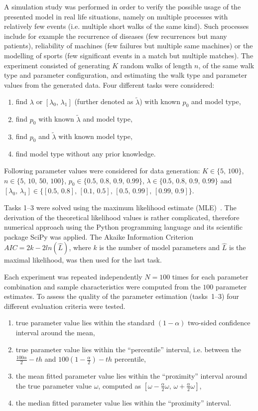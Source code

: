 \documentclass{amsart}
\theoremstyle{definition}
\theoremstyle{plain}
\theoremstyle{plain}
\theoremstyle{plain}
\numberwithin{equation}{section}
\begin{document}
    A simulation study was performed in order to verify the possible usage of the presented model in real life situations, namely on multiple processes with relatively few events (i.e. multiple short walks of the same kind).
    Such processes include for example the recurrence of diseases (few recurrences but many patients), reliability of machines (few failures but multiple same machines) or the modelling of sports (few significant events in a match but multiple matches).
    The experiment consisted of generating $K$ random walks of length $n$, of the same walk type and parameter configuration, and estimating the walk type and parameter values from the generated data.
    Four different tasks were considered:
    \begin{enumerate}
        \item find $\lambda$ or $[\lambda_{0},\,\lambda_{1}]$ (further denoted as $\tilde{\lambda}$) with known $p_{0}$ and model type,
        \item find $p_{0}$ with known $\tilde{\lambda}$ and model type,
        \item find $p_{0}$ and $\tilde{\lambda}$ with known model type,
        \item find model type without any prior knowledge.
    \end{enumerate}
    Following parameter values were considered for data generation: $K\in\{5,\,100\}$, $n\in\{5,\,10,\,50,\,100\}$, $p_{0}\in\{0.5,\,0.8,\,0.9,\,0.99\}$, $\lambda\in\{0.5,\,0.8,\,0.9,\,0.99\}$ and $[\lambda_{0},\,\lambda_{1}]\in\{[0.5,\,0.8],\,[0.1,\,0.5],\,[0.5,\,0.99],\,[0.99,\,0.9]\}$.


    Tasks 1--3 were solved using the maximum likelihood estimate (MLE)~\cite{rossi2018mathematical}.
    The derivation of the theoretical likelihood values is rather complicated, therefore numerical approach using the Python programming language and its scientific package SciPy was applied.
    The Akaike Information Criterion $AIC=2k-2ln(\hat{L})$, where $k$ is the number of model parameters and $\hat{L}$ is the maximal likelihood, was then used for the last task.

    Each experiment was repeated independently $N=100$ times for each parameter combination and sample characteristics were computed from the $100$ parameter estimates.
    To assess the quality of the parameter estimation (tasks~1--3) four different evaluation criteria were tested.
    \begin{enumerate}
        \item true parameter value lies within the standard $(1-\alpha)$ two-sided confidence interval around the mean,
        \item true parameter value lies within the ``percentile'' interval, i.e. between the $\frac{{100}\alpha}{2}-th$ and $100\left(1-\frac{\alpha}{2}\right)-th$ percentile,
        \item the mean fitted parameter value lies within the ``proximity'' interval around the true parameter value $\omega$, computed as $[\omega-\frac{\alpha}{2}\omega,\,\omega+\frac{\alpha}{2}\omega]$,
        \item the median fitted parameter value lies within the ``proximity'' interval.
    \end{enumerate}
\end{document}
